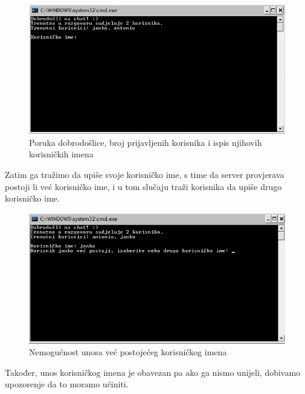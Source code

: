 \documentclass[10pt,a4paper,onecolumn,titlepage]{article}
\begin{document}
\begin{figure}[!ht]
\begin{minipage}{\textwidth}
\centering
\includegraphics[width=\textwidth]{images/welcome.jpg}
\caption{Poruka dobrodošlice, broj prijavljenih korisnika i ispis njihovih korisničkih imena}
\end{minipage}
\end{figure}

Zatim ga tražimo da upiše svoje korisničko ime, s time da server provjerava postoji li
već korisničko ime, i u tom slučaju traži korisnika da upiše drugo korisničko ime.

\begin{figure}[!ht]
\begin{minipage}{\textwidth}
\centering
\includegraphics[width=\textwidth]{images/invalid_username.jpg}
\caption{Nemogućnost unosa već postojećeg korisničkog imena}
\end{minipage}
\end{figure}

Također, unos korisničkog imena je obavezan pa ako ga nismo unijeli, dobivamo upozorenje da to moramo učiniti.
\end{document}
